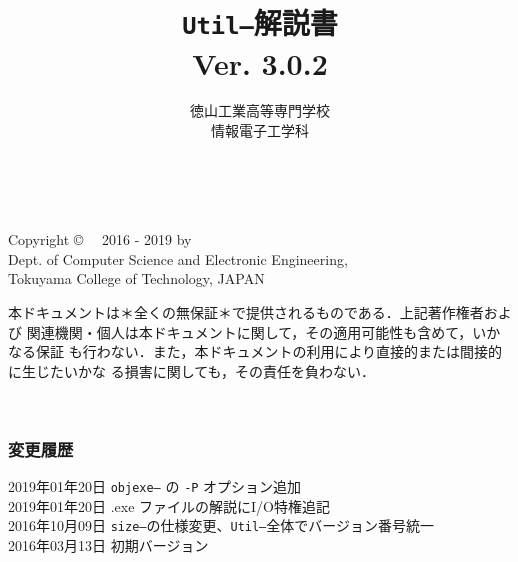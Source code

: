 \documentclass[11pt,a4j,twoside,dvipdfmx]{jbook}
\newcommand{\ver}{Ver. 3.0.2}
\newcommand{\util}{{\tt Util--}}
\newcommand{\objexe}{{\tt objexe--}}
\newcommand{\size}{{\tt size--}}
\begin{document}
\setlength{\oddsidemargin}{10pt}
\setlength{\evensidemargin}{-10pt}
\setlength{\headsep}{1cm}
\frontmatter

\title{\util 解説書 \\\ver}
\author{徳山工業高等専門学校\\情報電子工学科}
\date{}

\maketitle

\thispagestyle{empty}
~
\vfill
\begin{flushleft}
Copyright \copyright ~~ 2016 - 2019 by \\
Dept. of Computer Science and Electronic Engineering, \\
Tokuyama College of Technology, JAPAN
\end{flushleft}

\vspace{0.8cm}

本ドキュメントは＊全くの無保証＊で提供されるものである．上記著作権者および
関連機関・個人は本ドキュメントに関して，その適用可能性も含めて，いかなる保証
も行わない．また，本ドキュメントの利用により直接的または間接的に生じたいかな
る損害に関しても，その責任を負わない．
\setcounter{page}{0}

\tableofcontents

\mainmatter

\appendix

\backmatter
\pagestyle{empty}
\onecolumn
~
\subsubsection{変更履歴}
\begin{flushleft}
2019年01年20日 {\objexe} の \verb/-P/ オプション追加 \\
2019年01年20日 .exe ファイルの解説にI/O特権追記 \\
2016年10月09日 {\size}の仕様変更、{\util}全体でバージョン番号統一  \\
2016年03月13日 初期バージョン  \\
\end{flushleft}
\end{document}
